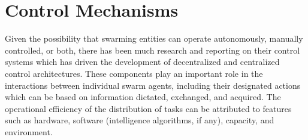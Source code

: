 \section*{Control Mechanisms}
Given the possibility that swarming entities can operate autonomously, manually controlled, or both, there has been much research and reporting on their control systems which has driven the development of decentralized and centralized control architectures. These components play an important role in the interactions between individual swarm agents, including their designated actions which can be based on information dictated, exchanged, and acquired. The operational efficiency of the distribution of tasks can be attributed to features such as hardware, software (intelligence algorithms, if any), capacity, and environment. 